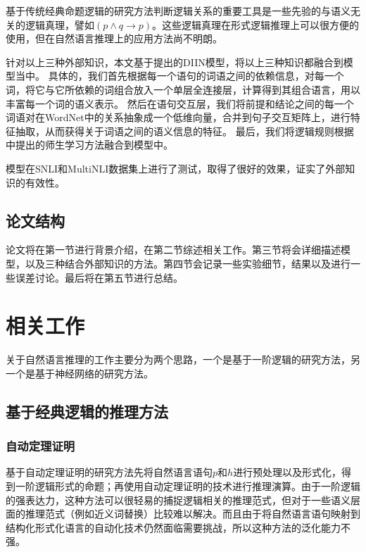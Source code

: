 \documentclass[UTF8,11pt,a4paper,nofonts]{ctexart}
\begin{document}
基于传统经典命题逻辑的研究方法判断逻辑关系的重要工具是一些先验的与语义无关的逻辑真理，譬如$(p\land q \to p)$。这些逻辑真理在形式逻辑推理上可以很方便的使用，但在自然语言推理上的应用方法尚不明朗。

针对以上三种外部知识，本文基于\cite{}提出的DIIN模型，将以上三种知识都融合到模型当中。
具体的，我们首先根据每一个语句的词语之间的依赖信息，对每一个词，将它与它所依赖的词组合放入一个单层全连接层，计算得到其组合语言，用以丰富每一个词的语义表示。
然后在语句交互层，我们将前提和结论之间的每一个词语对在WordNet中的关系抽象成一个低维向量，合并到句子交互矩阵上，进行特征抽取，从而获得关于词语之间的语义信息的特征。
最后，我们将逻辑规则根据\cite{}中提出的师生学习方法融合到模型中。

模型在SNLI和MultiNLI数据集上进行了测试，取得了很好的效果，证实了外部知识的有效性。





\subsection{论文结构}

论文将在第一节进行背景介绍，在第二节综述相关工作。第三节将会详细描述模型，以及三种结合外部知识的方法。第四节会记录一些实验细节，结果以及进行一些误差讨论。最后将在第五节进行总结。

\newpage
\section{相关工作}

关于自然语言推理的工作主要分为两个思路，一个是基于一阶逻辑的研究方法，另一个是基于神经网络的研究方法。

\subsection{基于经典逻辑的推理方法}

\subsubsection{自动定理证明}

基于自动定理证明的研究方法\cite{}先将自然语言语句$p$和$h$进行预处理以及形式化，得到一阶逻辑形式的命题；再使用自动定理证明\cite{}的技术进行推理演算。由于一阶逻辑的强表达力，这种方法可以很轻易的捕捉逻辑相关的推理范式，但对于一些语义层面的推理范式（例如近义词替换）比较难以解决。而且由于将自然语言语句映射到结构化形式化语言的自动化技术仍然面临需要挑战，所以这种方法的泛化能力不强。
\end{document}
